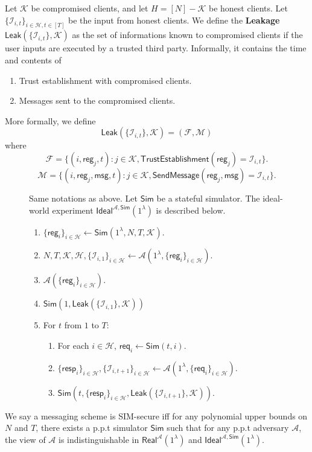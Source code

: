 \documentclass[sigconf, nonacm, balance=false, natbib=false, screen]{acmart}
\newcommand{\msg}{\mathsf{msg}}
\newcommand{\reg}{\mathsf{reg}}
\newcommand{\req}{\mathsf{req}}
\newcommand{\resp}{\mathsf{resp}}
\newcommand{\cK}{\mathcal{K}}
\newcommand{\Sim}{\mathsf{Sim}}
\newcommand{\cA}{\mathcal{A}}
\newcommand{\cI}{\mathcal{I}}
\newcommand{\cH}{\mathcal{H}}
\newcommand{\cF}{\mathcal{F}}
\newcommand{\cM}{\mathcal{M}}
\newcommand{\trust}{\mathsf{TrustEstablishment}}
\begin{document}
\begin{definition}[Leakage]
Let $\cK$ be compromised clients, and let $H = [N] - \cK$ be honest clients. Let $\{\cI_{i, t}\}_{i \in \cH, t \in [T]}$ be the input from honest clients. We define the \textbf{Leakage} $\mathsf{Leak}(\{\cI_{i, t}\}, \cK)$ as the set of informations known to compromised clients if the user inputs are executed by a trusted third party. Informally, it contains the time and contents of
\begin{enumerate}
    \item Trust establishment with compromised clients.
    \item Messages sent to the compromised clients.
\end{enumerate}
More formally, we define
$$\mathsf{Leak}(\{\cI_{i, t}\}, \cK) = (\cF, \cM)$$
where
$$\cF = \{(i, \reg_j, t): j \in \cK, \trust(\reg_j) = \cI_{i, t}\}.$$
$$\cM = \{(i, \reg_j, \msg, t): j \in \cK, \mathsf{SendMessage}(\reg_j, \msg) = \cI_{i, t}\}.$$
\end{definition}
\begin{figure}[h!]
\begin{framed}
\begin{definition}
Same notations as above. Let $\Sim$ be a stateful simulator. The ideal-world experiment $\mathsf{Ideal}^{\cA, \Sim}(1^{\lambda})$ is described below.
\begin{enumerate}
\item $\{\reg_i\}_{i \in \cH} \leftarrow \Sim(1^{\lambda}, N, T, \cK)$. 
\item $N, T, \cK, \cH, \{\cI_{i, 1}\}_{i \in \cH} \leftarrow \cA(1^{\lambda}, \{\reg_i\}_{i \in \cH})$.
\item $\cA(\{\reg_i\}_{i \in \cH})$.
\item $\Sim(1, \mathsf{Leak}(\{\cI_{i, 1}\}, \cK))$
\item For $t$ from $1$ to $T$:
    \begin{enumerate}
    \item For each $i \in \cH$, $\req_i \leftarrow \Sim(t, i)$.
    
    \item $\{\resp_i\}_{i \in \cH}, \{\cI_{i, t + 1}\}_{i \in \cH} \leftarrow \cA(1^{\lambda}, \{\req_i\}_{i \in \cH})$.
    
    \item $\Sim(t, \{\resp_i\}_{i \in \cH}, \mathsf{Leak}(\{\cI_{i, t + 1}\}, \cK))$.
    \end{enumerate}
\end{enumerate}
\end{definition}
\end{framed}
\end{figure}
\begin{definition}
We say a messaging scheme is SIM-secure iff for  any polynomial upper bounds on $N$ and $T$, there exists a p.p.t simulator $\Sim$ such that for any p.p.t adversary $\cA$, the view of $\cA$ is indistinguishable in $\mathsf{Real}^{\cA}(1^{\lambda})$ and $\mathsf{Ideal}^{\cA, \mathsf{\Sim}}(1^{\lambda})$.
\end{definition}
\end{document}
